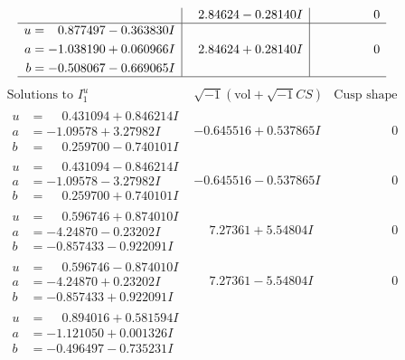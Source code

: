 \documentclass[1p]{elsarticle_modified}
\theoremstyle{definition}
\newcommand{\I}{\sqrt{-1}}
\begin{document}
$$\begin{array}{c|c|c}
 & \phantom{-}2.84624 - 0.28140 I & \phantom{-0.000000 } 0 \\ \hline\begin{aligned}
u &= \phantom{-}0.877497 - 0.363830 I \\
a &= -1.038190 + 0.060966 I \\
b &= -0.508067 - 0.669065 I\end{aligned}
 & \phantom{-}2.84624 + 0.28140 I & \phantom{-0.000000 } 0\\
 \hline 
 \end{array}$$\newpage$$\begin{array}{c|c|c}  
\text{Solutions to }I^u_{1}& \I (\text{vol} + \sqrt{-1}CS) & \text{Cusp shape}\\
 \hline 
\begin{aligned}
u &= \phantom{-}0.431094 + 0.846214 I \\
a &= -1.09578 + 3.27982 I \\
b &= \phantom{-}0.259700 - 0.740101 I\end{aligned}
 & -0.645516 + 0.537865 I & \phantom{-0.000000 } 0 \\ \hline\begin{aligned}
u &= \phantom{-}0.431094 - 0.846214 I \\
a &= -1.09578 - 3.27982 I \\
b &= \phantom{-}0.259700 + 0.740101 I\end{aligned}
 & -0.645516 - 0.537865 I & \phantom{-0.000000 } 0 \\ \hline\begin{aligned}
u &= \phantom{-}0.596746 + 0.874010 I \\
a &= -4.24870 - 0.23202 I \\
b &= -0.857433 - 0.922091 I\end{aligned}
 & \phantom{-}7.27361 + 5.54804 I & \phantom{-0.000000 } 0 \\ \hline\begin{aligned}
u &= \phantom{-}0.596746 - 0.874010 I \\
a &= -4.24870 + 0.23202 I \\
b &= -0.857433 + 0.922091 I\end{aligned}
 & \phantom{-}7.27361 - 5.54804 I & \phantom{-0.000000 } 0 \\ \hline\begin{aligned}
u &= \phantom{-}0.894016 + 0.581594 I \\
a &= -1.121050 + 0.001326 I \\
b &= -0.496497 - 0.735231 I\end{aligned}

\end{array}$$
\end{document}
